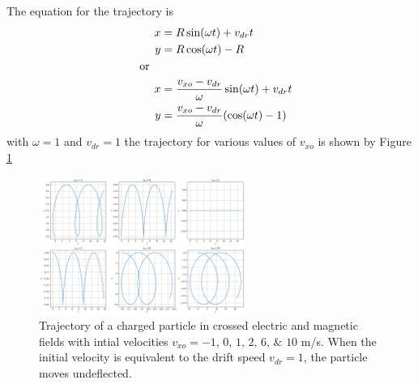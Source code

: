 \documentclass[../problems.tex]{subfiles}
\begin{document}
The equation for the trajectory is
\begin{align*}
    x &= R \sin(\omega t) + v_{dr}t \\
    y &= R\cos(\omega t) - R \\
    \qor \\
    x &= \frac{v_{xo}-v_{dr}}{\omega} \sin(\omega t) + v_{dr}t \\
    y &= \frac{v_{xo}-v_{dr}}{\omega} (\cos(\omega t) - 1)
\end{align*}
with $\omega=1$ and $v_{dr} = 1$ the trajectory for various values of $v_{xo}$ is shown by Figure
\ref{fig:2_55}
\begin{figure}[ht]
    \centering
    \includegraphics[width=0.6\textwidth]{fig2_55.png}
    \captionsetup{width=0.8\textwidth}
    \caption{Trajectory of a charged particle in crossed electric and magnetic fields with intial
    velocities $v_{xo}= \numlist{-1;0;1;2;6;10}$ m/s. When the initial velocity is equivalent to the
    drift speed $v_{dr} = 1$, the particle moves undeflected.}
    \label{fig:2_55}
\end{figure}
\end{document}
